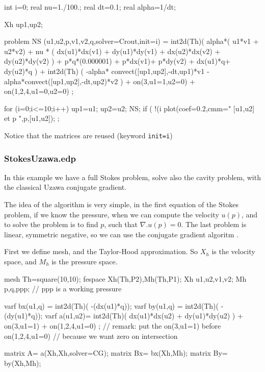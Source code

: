 \documentclass[twoside]{book}
\begin{document}
int i=0;
real  nu=1./100.;
real dt=0.1;
real alpha=1/dt;

Xh up1,up2;

problem  NS (u1,u2,p,v1,v2,q,solver=Crout,init=i) =
    int2d(Th)(
             alpha*( u1*v1 + u2*v2)
            + nu * ( dx(u1)*dx(v1) + dy(u1)*dy(v1)
            +  dx(u2)*dx(v2) + dy(u2)*dy(v2) )
            + p*q*(0.000001)
            + p*dx(v1)+ p*dy(v2)
            + dx(u1)*q+ dy(u2)*q
           )
  + int2d(Th) ( -alpha*
       convect([up1,up2],-dt,up1)*v1 -alpha*convect([up1,up2],-dt,up2)*v2 )
  + on(3,u1=1,u2=0)
  + on(1,2,4,u1=0,u2=0)
;

for (i=0;i<=10;i++)
 {
   up1=u1;
   up2=u2;
   NS;
   if ( !(i %
    plot(coef=0.2,cmm=" [u1,u2] et p  ",p,[u1,u2]);
 } ;
\eFF

Notice that the matrices are  reused (keyword
\texttt{init=i})

\subsubsection{StokesUzawa.edp}

In this example we have a full Stokes problem, solve also the cavity problem,
with the
classical \label{Uzawa} Uzawa conjugate gradient.

The idea of the algorithm is very simple, in the first equation of the Stokes problem, if
we know the pressure, when we can compute the velocity $u(p)$, and to solve
the problem is to find $p$, such that $ \nabla. u(p) =0$. The last problem is
linear, symmetric negative, so we can use the conjugate gradient algoritm 
.

First we define mesh, and the Taylor-Hood   approximation.
So $X_{h}$  is the velocity space, and $M_{h}$ is the pressure space.

\bFF

mesh Th=square(10,10);
fespace Xh(Th,P2),Mh(Th,P1);
Xh u1,u2,v1,v2;
Mh p,q,ppp;  //  ppp is a working pressure
\eFF

\bFF

varf bx(u1,q) = int2d(Th)( -(dx(u1)*q));
varf by(u1,q) = int2d(Th)( -(dy(u1)*q));
varf a(u1,u2)= int2d(Th)(  dx(u1)*dx(u2) + dy(u1)*dy(u2) )
                    +  on(3,u1=1)  +  on(1,2,4,u1=0) ;
//  remark:  put the on(3,u1=1) before  on(1,2,4,u1=0) 
//  because we want zero on intersection 
 
matrix A= a(Xh,Xh,solver=CG);
matrix Bx= bx(Xh,Mh);
matrix By= by(Xh,Mh);
\end{document}
